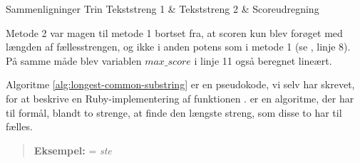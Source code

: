                                      { Sammenligninger }
       {Trin}{ Tekststreng 1        & Tekststreng 2                  & Scoreudregning                           }{
}

Metode 2 var magen til metode 1 bortset fra, at scoren kun blev forøget med længden af fællesstrengen, og ikke i anden potens som i metode 1 (se , linje 8). På samme måde blev variablen $max\_score$ i linje 11 også beregnet lineært.

\begin{algorithm} [H]
	\label{alg:compare}
	
\end{algorithm}

\begin{algorithm} [H]
	\label{alg:longest-common-substring}
	
\end{algorithm}

Algoritme \ref{alg:longest-common-substring} er en pseudokode, vi selv har skrevet, for at beskrive en Ruby-implementering\cite{longestcommonsubstringrubywiki} af funktionen .  er en algoritme, der har til formål, blandt to strenge, at finde den længste streng, som disse to har til fælles. 

\begin{quote}
\textbf{Eksempel:}  = \textit{ste}
\end{quote}

